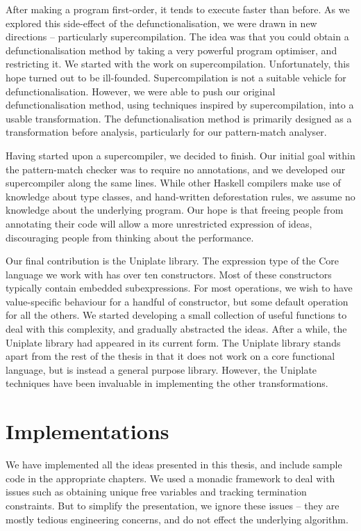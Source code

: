 After making a program first-order, it tends to execute faster than before. As we explored this side-effect of the defunctionalisation, we were drawn in new directions -- particularly supercompilation. The idea was that you could obtain a defunctionalisation method by taking a very powerful program optimiser, and restricting it. We started with the work on supercompilation. Unfortunately, this hope turned out to be ill-founded. Supercompilation is not a suitable vehicle for defunctionalisation. However, we were able to push our original defunctionalisation method, using techniques inspired by supercompilation, into a usable transformation. The defunctionalisation method is primarily designed as a transformation before analysis, particularly for our pattern-match analyser.

Having started upon a supercompiler, we decided to finish. Our initial goal within the pattern-match checker was to require no annotations, and we developed our supercompiler along the same lines. While other Haskell compilers make use of knowledge about type classes, and hand-written deforestation rules, we assume no knowledge about the underlying program. Our hope is that freeing people from annotating their code will allow a more unrestricted expression of ideas, discouraging people from thinking about the performance.

Our final contribution is the Uniplate library. The expression type of the Core language we work with has over ten constructors. Most of these constructors typically contain embedded subexpressions. For most operations, we wish to have value-specific behaviour for a handful of constructor, but some default operation for all the others. We started developing a small collection of useful functions to deal with this complexity, and gradually abstracted the ideas. After a while, the Uniplate library had appeared in its current form. The Uniplate library stands apart from the rest of the thesis in that it does not work on a core functional language, but is instead a general purpose library. However, the Uniplate techniques have been invaluable in implementing the other transformations.


\section{Implementations}

We have implemented all the ideas presented in this thesis, and include sample code in the appropriate chapters. We used a monadic framework to deal with issues such as obtaining unique free variables and tracking termination constraints. But to simplify the presentation, we ignore these issues -- they are mostly tedious engineering concerns, and do not effect the underlying algorithm.

